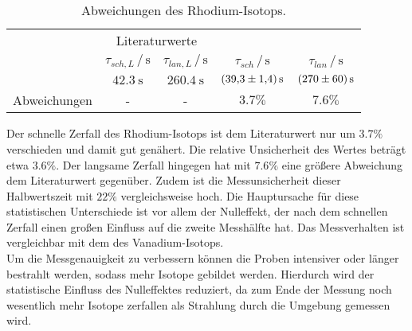 \begin{table}
    \centering
    \caption{Abweichungen des Rhodium-Isotops.}
    \label{tab:abwRh}
    \begin{tabular}{c c c c c}
        \toprule
        & \multicolumn{2}{c}{Literaturwerte\cite{RhIsotopes}} & & \\
        & $\tau_{sch, L}\,/\,\si{\second}$ & $\tau_{lan, L}\,/\,\si{\second}$ & $\tau_{sch}\,/\,\si{\second}$ & $\tau_{lan}\,/\,\si{\second}$ \\
        \midrule
        & $\SI{42.3}{\second}$ & $\SI{260.4}{\second}$ & $\SI{39.3\pm1.4}{\second}$ & $\SI{270\pm60}{\second}$ \\
        Abweichungen & - & - & $3.7\%$ & $7.6\%$ \\
        \bottomrule
    \end{tabular}
\end{table}

Der schnelle Zerfall des Rhodium-Isotops ist dem Literaturwert nur um $3.7\%$ verschieden und damit gut genähert. Die relative Unsicherheit des Wertes beträgt etwa $3.6\%$.
Der langsame Zerfall hingegen hat mit $7.6\%$ eine größere Abweichung dem Literaturwert gegenüber. Zudem ist die Messunsicherheit dieser Halbwertszeit mit $22\%$ vergleichsweise hoch.
Die Hauptursache für diese statistischen Unterschiede ist vor allem der Nulleffekt, der nach dem schnellen Zerfall einen großen Einfluss auf die zweite Messhälfte hat.
Das Messverhalten ist vergleichbar mit dem des Vanadium-Isotops. \\

Um die Messgenauigkeit zu verbessern können die Proben intensiver oder länger bestrahlt werden, sodass mehr Isotope gebildet werden. Hierdurch wird der statistische Einfluss
des Nulleffektes reduziert, da zum Ende der Messung noch wesentlich mehr Isotope zerfallen als Strahlung durch die Umgebung gemessen wird.
